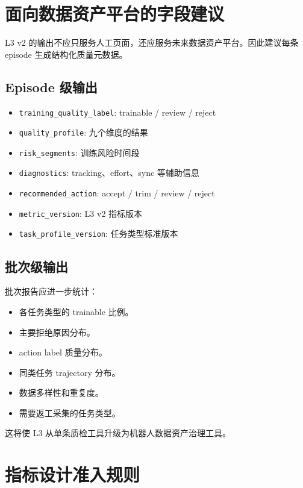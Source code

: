 \documentclass[UTF8,zihao=-4,oneside,openany]{ctexrep}
\begin{document}
\section{面向数据资产平台的字段建议}

L3 v2 的输出不应只服务人工页面，还应服务未来数据资产平台。因此建议每条 episode 生成结构化质量元数据。

\subsection{Episode 级输出}

\begin{itemize}
  \item \texttt{training\_quality\_label}: trainable / review / reject
  \item \texttt{quality\_profile}: 九个维度的结果
  \item \texttt{risk\_segments}: 训练风险时间段
  \item \texttt{diagnostics}: tracking、effort、sync 等辅助信息
  \item \texttt{recommended\_action}: accept / trim / review / reject
  \item \texttt{metric\_version}: L3 v2 指标版本
  \item \texttt{task\_profile\_version}: 任务类型标准版本
\end{itemize}

\subsection{批次级输出}

批次报告应进一步统计：

\begin{itemize}
  \item 各任务类型的 trainable 比例。
  \item 主要拒绝原因分布。
  \item action label 质量分布。
  \item 同类任务 trajectory 分布。
  \item 数据多样性和重复度。
  \item 需要返工采集的任务类型。
\end{itemize}

这将使 L3 从单条质检工具升级为机器人数据资产治理工具。

\section{指标设计准入规则}
\end{document}
